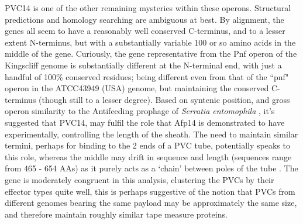 PVC14 is one of the other remaining mysteries within these operons. Structural predictions and homology searching are ambiguous at best. By alignment, the genes all seem to have a reasonably well conserved C-terminus, and to a lesser extent N-terminus, but with a substantially variable 100 or so amino acids in the middle of the gene. Curiously, the gene representative from the Pnf operon of the Kingscliff genome is substantially different at the N-terminal end, with just a handful of 100\% conserved residues; being different even from that of the ``pnf" operon in the ATCC43949 (USA) genome, but maintaining the conserved C-terminus (though still to a lesser degree). Based on syntenic position, and gross operon similarity to the Antifeeding prophage of \emph{Serratia entomophila} \citep{Heymann2013}, it's suggested that PVC14, may fulfil the role that Afp14 is demonstrated to have experimentally, controlling the length of the sheath. The need to maintain similar termini, perhaps for binding to the 2 ends of a PVC tube, potentially speaks to this role, whereas the middle may drift in sequence and length (sequences range from 465 - 654 AAs) as it purely acts as a `chain' between poles of the tube \citep{Rybakova2015}. The gene is moderately congruent in this analysis, clustering the PVCs by their effector types quite well, this is perhaps suggestive of the notion that PVCs from different genomes bearing the same payload may be approximately the same size, and therefore maintain roughly similar tape measure proteins.
 

